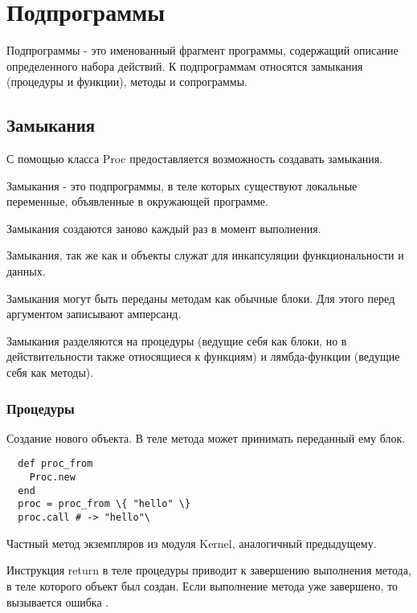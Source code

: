 \chapter{Подпрограммы}

Подпрограммы - это именованный фрагмент программы, содержащий описание определенного набора действий. К подпрограммам относятся замыкания (процедуры и функции), методы и сопрограммы.

\section{Замыкания}

С помощью класса Proc предоставляется возможность создавать замыкания. 

Замыкания - это подпрограммы, в теле которых существуют локальные переменные, объявленные в окружающей программе.

Замыкания создаются заново каждый раз в момент выполнения.

Замыкания, так же как и объекты служат для инкапсуляции функциональности и данных.

Замыкания могут быть переданы методам как обычные блоки. Для этого перед аргументом записывают амперсанд.

Замыкания разделяются на процедуры (ведущие себя как блоки, но в действительности также относящиеся к функциям) и лямбда-функции (ведущие себя как методы).

\subsection{Процедуры}

\begin{methodlist}
  Создание нового объекта. В теле метода может принимать переданный ему блок.
  \begin{verbatim}
  def proc_from
    Proc.new
  end
  proc = proc_from \{ "hello" \}
  proc.call # -> "hello"\
  \end{verbatim}

  Частный метод экземпляров из модуля Kernel, аналогичный предыдущему.
\end{methodlist}

Инструкция return в теле процедуры приводит к завершению выполнения метода, в теле которого объект был создан. Если выполнение метода уже завершено, то вызывается ошибка .

